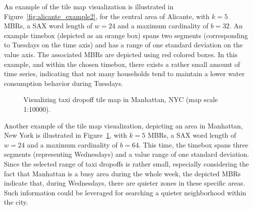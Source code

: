 An example of the tile map visualization is illustrated in Figure~\ref{fig:alicante_example2}, for the central area of Alicante, with $k=5$ MBRs, a SAX word length of $w=24$ and a maximum cardinality of $b=32$. An example timebox (depicted as an orange box) spans two \isax segments (corresponding to Tuesdays on the time axis) and has a range of one standard deviation on the value axis. The associated MBRs are depicted using red colored boxes. In this example, and within the chosen timebox, there exists a rather small amount of time series, indicating that not many households tend to maintain a lower water consumption behavior during Tuesdays.

\begin{figure}[!ht]
 \centering
 \caption{Visualizing taxi dropoff tile map in Manhattan, NYC (map scale 1:10000).}
 \vspace{-7.5pt}
 \label{fig:nyc_example2}
\end{figure}

Another example of the tile map visualization, depicting an area in Manhattan, New York is illustrated in Figure~\ref{fig:nyc_example2}, with $k=5$ MBRs, a SAX word length of $w=24$ and a maximum cardinality of $b=64$. This time, the timebox spans three \isax segments (representing Wednesdays) and a value range of one standard deviation. Since the selected range of taxi dropoffs is rather small, especially considering the fact that Manhattan is a busy area during the whole week, the depicted MBRs indicate that, during Wednesdays, there are quieter zones in these specific areas. Such information could be leveraged for searching a quieter neighborhood within the city.


